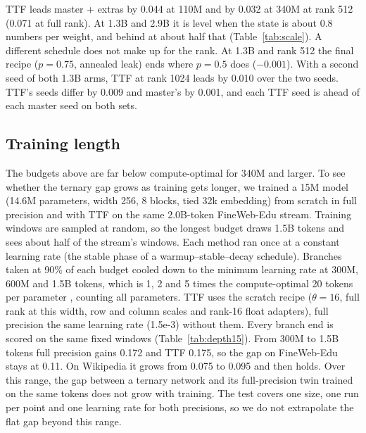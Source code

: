 \documentclass[10pt,twocolumn]{article}
\begin{document}
TTF leads master + extras by 0.044 at 110M and by 0.032 at 340M at rank 512 (0.071 at full rank). At 1.3B and 2.9B
it is level when the state is about 0.8 numbers per weight, and behind at about half that (Table~\ref{tab:scale}). A
different schedule does not make up for the rank. At 1.3B and rank 512 the final recipe ($p=0.75$, annealed leak) ends
where $p=0.5$ does ($-0.001$). With a second seed of both 1.3B arms, TTF at rank 1024 leads by 0.010 over the two seeds.
TTF's seeds differ by 0.009 and master's by 0.001, and each TTF seed is ahead of each master seed on both sets.

\subsection{Training length}\label{sec:depth15}
The budgets above are far below compute-optimal for 340M and larger. To see whether the ternary gap grows as training
gets longer, we trained a 15M model (14.6M parameters, width 256, 8 blocks, tied 32k embedding) from scratch in full
precision and with TTF on the same 2.0B-token FineWeb-Edu stream. Training windows are sampled at random, so the longest
budget draws 1.5B tokens and sees about half of the stream's windows. Each method ran once at a constant learning rate
(the stable phase of a warmup--stable--decay schedule). Branches taken at 90\% of each budget cooled down to the minimum
learning rate at 300M, 600M and 1.5B tokens, which is 1, 2 and 5 times the compute-optimal 20 tokens per parameter
\citep{hoffmann2022chinchilla}, counting all parameters. TTF uses the scratch recipe ($\theta=16$, full rank at this
width, row and column scales and rank-16 float adapters), full precision the same learning rate (1.5e-3) without them.
Every branch end is scored on the same fixed windows (Table~\ref{tab:depth15}). From 300M to 1.5B tokens full precision
gains 0.172 and TTF 0.175, so the gap on FineWeb-Edu stays at 0.11. On Wikipedia it grows from 0.075 to 0.095 and then
holds. Over this range, the gap between a ternary network and its full-precision twin trained on the same tokens does
not grow with training. The test covers one size, one run per point and one learning rate for both precisions, so we do
not extrapolate the flat gap beyond this range.
\end{document}

